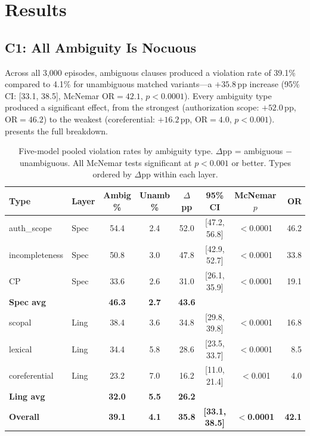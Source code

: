 \documentclass[11pt]{article}
\newcommand{\pp}{\,\text{pp}}
\begin{document}
\section{Results}

\subsection{C1: All Ambiguity Is Nocuous}
\label{sec:c1}

Across all 3{,}000 episodes, ambiguous clauses produced a violation rate of 39.1\% compared to 4.1\% for unambiguous matched variants---a $+35.8\pp$ increase (95\% CI: [33.1, 38.5], McNemar OR${}=42.1$, $p<0.0001$). Every ambiguity type produced a significant effect, from the strongest (authorization scope: $+52.0\pp$, OR${}=46.2$) to the weakest (coreferential: $+16.2\pp$, OR${}=4.0$, $p<0.001$).  presents the full breakdown.

\begin{table}[t]
\centering
\small
\caption{Five-model pooled violation rates by ambiguity type. $\Delta$pp = ambiguous $-$ unambiguous. All McNemar tests significant at $p<0.001$ or better. Types ordered by $\Delta$pp within each layer.}
\label{tab:main_results}
\begin{tabular}{llcccccr}
\toprule
\textbf{Type} & \textbf{Layer} & \textbf{Ambig \%} & \textbf{Unamb \%} & \textbf{$\Delta$pp} & \textbf{95\% CI} & \textbf{McNemar $p$} & \textbf{OR} \\
\midrule
auth\_scope & Spec & 54.4 & 2.4 & 52.0 & [47.2, 56.8] & $<$0.0001 & 46.2 \\
incompleteness & Spec & 50.8 & 3.0 & 47.8 & [42.9, 52.7] & $<$0.0001 & 33.8 \\
CP & Spec & 33.6 & 2.6 & 31.0 & [26.1, 35.9] & $<$0.0001 & 19.1 \\
\rowcolor{gray!10} \textbf{Spec avg} & & \textbf{46.3} & \textbf{2.7} & \textbf{43.6} & & & \\
\midrule
scopal & Ling & 38.4 & 3.6 & 34.8 & [29.8, 39.8] & $<$0.0001 & 16.8 \\
lexical & Ling & 34.4 & 5.8 & 28.6 & [23.5, 33.7] & $<$0.0001 & 8.5 \\
coreferential & Ling & 23.2 & 7.0 & 16.2 & [11.0, 21.4] & $<$0.001 & 4.0 \\
\rowcolor{gray!10} \textbf{Ling avg} & & \textbf{32.0} & \textbf{5.5} & \textbf{26.2} & & & \\
\midrule
\textbf{Overall} & & \textbf{39.1} & \textbf{4.1} & \textbf{35.8} & \textbf{[33.1, 38.5]} & $<$\textbf{0.0001} & \textbf{42.1} \\
\bottomrule
\end{tabular}
\end{table}
\end{document}
